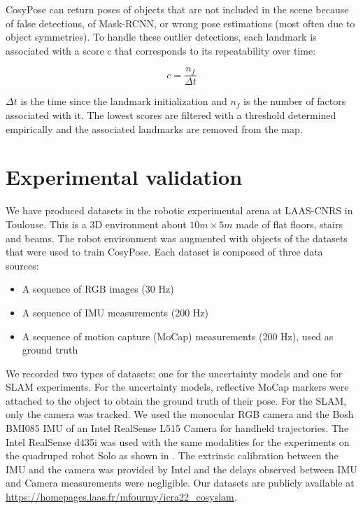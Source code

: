 CosyPose can return poses of objects that are not included in the scene because of false detections, of Mask-RCNN, or wrong pose estimations (most often due to object symmetries). 
To handle these outlier detections, each landmark is associated with a score $c$ that corresponds to its repeatability over time: 

\begin{equation}
    c = \frac{n_f}{\Delta t}
\end{equation}

$\Delta t$ is the time since the landmark initialization and $n_f$ is the number of factors associated with it.
The lowest scores are filtered with a threshold determined empirically and the associated landmarks are removed from the map.




\section{Experimental validation}

We have produced datasets in the robotic experimental arena at LAAS-CNRS in Toulouse. This is a 3D environment about $10 m \times 5m$ made of flat floors, 
stairs and beams. The robot environment was augmented with objects of the datasets that were used to train CosyPose. Each dataset is composed of three data sources:

\begin{itemize}
    \item A sequence of RGB images (30 Hz)
    \item A sequence of IMU measurements (200 Hz)
    \item A sequence of motion capture (MoCap) measurements (200 Hz), used as ground truth 
\end{itemize}

We recorded two types of datasets: one for the uncertainty models and one for SLAM experiments. For the uncertainty models, reflective MoCap markers 
were attached to the object to obtain the ground truth of their pose. For the SLAM, only the camera was tracked. We used the monocular RGB camera and the Bosh BMI085 
IMU of an Intel RealSense L515 Camera for handheld trajectories. The Intel RealSense d435i was used with the same modalities 
for the experiments on the quadruped robot Solo \cite{grimminger2020open} as shown in . 
The extrinsic calibration between the IMU and the camera was provided by Intel and the delays observed between IMU and Camera measurements were negligible. 
Our datasets are publicly available at \url{https://homepages.laas.fr/mfourmy/icra22_cosyslam}.





